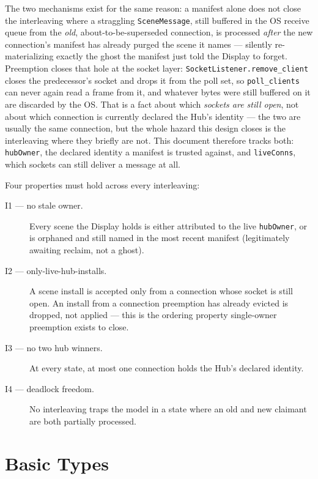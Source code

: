 \documentclass[a4paper,10pt,fleqn]{article}
\begin{document}
The two mechanisms exist for the same reason: a manifest alone does not
close the interleaving where a straggling \texttt{SceneMessage}, still
buffered in the OS receive queue from the \emph{old}, about-to-be-superseded
connection, is processed \emph{after} the new connection's manifest has
already purged the scene it names --- silently re-materializing exactly the
ghost the manifest just told the Display to forget.  Preemption closes
that hole at the socket layer: \texttt{SocketListener.remove\_client}
closes the predecessor's socket and drops it from the poll set, so
\texttt{poll\_clients} can never again read a frame from it, and whatever
bytes were still buffered on it are discarded by the OS.  That is a fact
about which \emph{sockets are still open}, not about which connection is
currently declared the Hub's identity --- the two are usually the same
connection, but the whole hazard this design closes is the interleaving
where they briefly are not.  This document therefore tracks both:
\texttt{hubOwner}, the declared identity a manifest is trusted against, and
\texttt{liveConns}, which sockets can still deliver a message at all.

Four properties must hold across every interleaving:

\begin{description}
  \item[I1 --- no stale owner.] Every scene the Display holds is either
    attributed to the live \texttt{hubOwner}, or is orphaned and still
    named in the most recent manifest (legitimately awaiting reclaim, not
    a ghost).
  \item[I2 --- only-live-hub-installs.] A scene install is accepted only
    from a connection whose socket is still open.  An install from a
    connection preemption has already evicted is dropped, not applied ---
    this is the ordering property single-owner preemption exists to close.
  \item[I3 --- no two hub winners.] At every state, at most one connection
    holds the Hub's declared identity.
  \item[I4 --- deadlock freedom.] No interleaving traps the model in a
    state where an old and new claimant are both partially processed.
\end{description}

\section{Basic Types}
\end{document}
